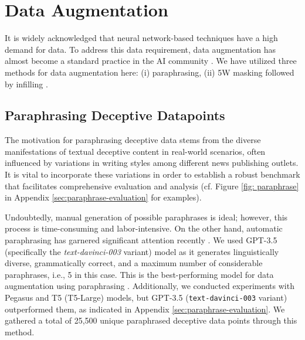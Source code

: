 \section{Data Augmentation}
\vspace{-1mm}
\label{sec:data_augmentation}
It is widely acknowledged that neural network-based techniques have a high demand for data. To address this data requirement, data augmentation has almost become a standard practice in the AI community \cite{van2001art,shorten2021text,liu2020survey}. 
We have utilized three methods for data augmentation here: (i) paraphrasing, (ii) 5W masking followed by infilling \cite{gao-etal-2022-mask}.

\subsection{Paraphrasing Deceptive Datapoints}
\vspace{-1mm}
The motivation for paraphrasing deceptive data stems from the diverse manifestations of textual deceptive content in real-world scenarios, often influenced by variations in writing styles among different news publishing outlets. It is vital to incorporate these variations in order to establish a robust benchmark that facilitates comprehensive evaluation and analysis (cf. Figure \ref{fig: paraphrase} in Appendix \ref{sec:paraphrase-evaluation} for examples).
 
Undoubtedly, manual generation of possible paraphrases is ideal; however, this process is time-consuming and labor-intensive. On the other hand, automatic paraphrasing has garnered significant attention recently \cite{niu2020unsupervised, nicula2021automated, witteveen2019paraphrasing, nighojkar2021improving}. We used GPT-3.5 \cite{brown2020language} (specifically the \textit{text-davinci-003} variant) \cite{brown2020language} model as it generates linguistically diverse, grammatically correct, and a maximum number of considerable paraphrases, i.e., 5 in this case. This is the best-performing model for data augmentation using paraphrasing \cite{rani2023factify5wqa}. Additionally, we conducted experiments with Pegasus \cite{zhang2020pegasus} and T5 (T5-Large) \cite{raffel2020exploring} models, but GPT-3.5 (\texttt{text-davinci-003} variant) \cite{brown2020language} outperformed them, as indicated in Appendix \ref{sec:paraphrase-evaluation}. We gathered a total of 25,500 unique paraphrased deceptive data points through this method. 

